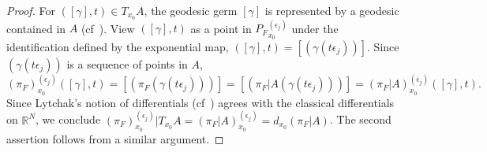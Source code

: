 \documentclass[12pt]{amsart}
\theoremstyle{definition}
\numberwithin{equation}{section}
\newcommand{\R}{\mathbb R}
\newcommand{\ee}{{(\epsilon_j)}}
\newcommand{\PF}{P_F}
\begin{document}
\begin{proof}
For $([\gamma],t)\in T_{x_0}A$,   the geodesic germ $[\gamma]$ is represented by a geodesic contained in $A$ (cf~\cite[Lemma 4.1.2]{kleiner-leeb}).  View $([\gamma],t)$ as a point in ${\PF}_{ x_0}^\ee$ under the identification defined by the exponential map, $([\gamma],t)=[(\gamma(t \epsilon_j))]$.  Since $(\gamma(t \epsilon_j))$ is a sequence of points in $A$, 
$$(\pi_F)_{x_0}^{(\epsilon_j)} ([\gamma],t) = [(\pi_F(\gamma(t \epsilon_j)))]=[(\pi_F|A(\gamma(t \epsilon_j)))]= (\pi_F|A)_{x_0}^{(\epsilon_j)}  ([\gamma],t).
$$ Since Lytchak's notion of differentials (cf~\cite{lytchak}) agrees with the classical differentials on $\R^N$, we conclude $(\pi_F)_{x_0}^{(\epsilon_j)}|T_{x_0}A= (\pi_F|A)_{x_0}^\ee= d_{x_0}(\pi_F|A)$. 
The second assertion follows from a similar argument.
\end{proof}
\end{document}
